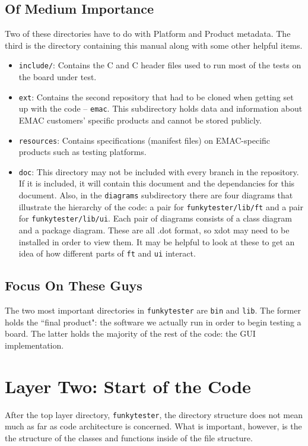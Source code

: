 \documentclass{report}
\begin{document}
\subsection{Of Medium Importance} \label{subsec:medium}
Two of these directories have to do with Platform and Product metadata. The third is the directory containing this manual along with some other helpful items.
\begin{itemize}
	\item \texttt{include/}: Contains the C and C header files used to run most of the tests on the board under test.
	\item \texttt{ext}: Contains the second repository that had to be cloned when getting set up with the code -- \texttt{emac}. This subdirectory holds data and information about EMAC customers' specific products and cannot be stored publicly.
	\item \texttt{resources}: Contains specifications (manifest files) on EMAC-specific products such as testing platforms.
	\item \texttt{doc}: This directory may not be included with every branch in the repository. If it is included, it will contain this document and the dependancies for this document. Also, in the \texttt{diagrams} subdirectory there are four diagrams that illustrate the hierarchy of the code: a pair for \texttt{funkytester/lib/ft} and a pair for \texttt{funkytester/lib/ui}. Each pair of diagrams consists of a class diagram and a package diagram. These are all .dot format, so xdot may need to be installed in order to view them. It may be helpful to look at these to get an idea of how different parts of \texttt{ft} and \texttt{ui} interact.
\end{itemize}

\subsection{Focus On These Guys}
The two most important directories in \texttt{funkytester} are \texttt{bin} and \texttt{lib}. The former holds the ``final product": the software we actually run in order to begin testing a board. The latter holds the majority of the rest of the code: the GUI implementation.

\section{Layer Two: Start of the Code} \label{sec:layer2}
After the top layer directory, \texttt{funkytester}, the directory structure does not mean much as far as code architecture is concerned. What is important, however, is the the structure of the classes and functions inside of the file structure.
\end{document}
